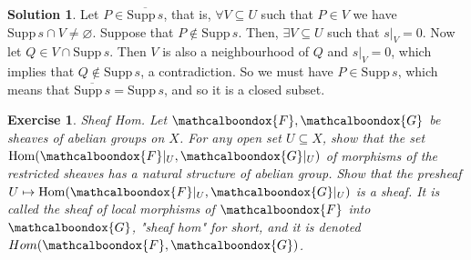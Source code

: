 \documentclass[12pt]{article}
\newtheorem{ex}{Exercise}[section]
\theoremstyle{definition}
\newtheorem*{sol}{Solution}
\newcommand{\sF}{\ensuremath{\mathcalboondox{F}}}
\newcommand{\sG}{\ensuremath{\mathcalboondox{G}}}
\begin{document}
\begin{sol}
	Let $P \in \overline{\mathrm{Supp} \, s}$, that is, $\forall V \subseteq U$ such that $P \in V$ we have $\mathrm{Supp} \, s \cap V \neq \varnothing$. Suppose that $P \notin \mathrm{Supp} \, s$. Then, $\exists V \subseteq U$ such that $s|_V = 0$. Now let $Q \in V \cap \mathrm{Supp} \, s$. Then $V$ is also a neighbourhood of $Q$ and $s|_V = 0$, which implies that $Q \notin \mathrm{Supp} \, s$, a contradiction. So we must have $P \in \mathrm{Supp} \, s$, which means that $\overline{\mathrm{Supp} \, s} = \mathrm{Supp} \, s$, and so it is a closed subset. 
\end{sol}

\begin{ex}
	Sheaf Hom. Let $\sF, \sG$ be sheaves of abelian groups on $X$. For any open set $U \subseteq X$, show that the set $\mathrm{Hom}(\sF|_U, \sG|_U)$ of morphisms of the restricted sheaves has a natural structure of abelian group. Show that the presheaf $U \mapsto \mathrm{Hom}(\sF|_U, \sG|_U)$ is a sheaf. It is called the sheaf of local morphisms of $\sF$ into $\sG$, "sheaf hom" for short, and it is denoted $Hom(\sF, \sG)$.
\end{ex}
\end{document}
